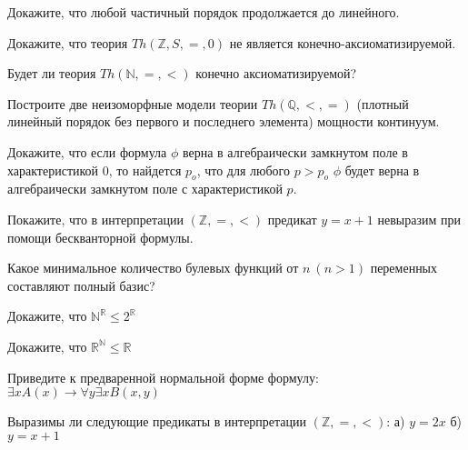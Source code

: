 \begin{task}
    Докажите, что любой частичный порядок продолжается до линейного.
\end{task}

\begin{task}
    Докажите, что теория $Th(\mathbb{Z}, S, =, 0)$ не является
    конечно-аксиоматизируемой.
\end{task}

\begin{task}
    Будет ли теория $Th(\mathbb{N}, =, <)$ конечно аксиоматизируемой?
\end{task}

\begin{task}
    Построите две неизоморфные модели теории $Th(\mathbb{Q}, <, =)$
    (плотный линейный порядок без первого и последнего элемента)
    мощности континуум.
\end{task}

\begin{task}
    Докажите, что если формула $\phi$ верна в алгебраически замкнутом
    поле в характеристикой 0, то найдется $p_o$, что для любого $p >
    p_o$ $\phi$ будет верна в алгебраически замкнутом поле с
    характеристикой $p$.
\end{task}

\begin{task}
    Покажите, что в интерпретации $(\mathbb{Z}, =, <)$ предикат $y = x
    + 1$ невыразим при помощи бескванторной формулы.
\end{task}

\begin{task}
    Какое минимальное количество булевых функций от $n~ (n > 1)$
    переменных составляют полный базис?
\end{task}

\begin{task}
    Докажите, что $\mathbb{N}^{\mathbb{R}} \le 2^{\mathbb{R}}$
\end{task}

\begin{task}
    Докажите, что $\mathbb{R}^{\mathbb{N}} \le \mathbb{R}$
\end{task}

\begin{task}
    Приведите к предваренной нормальной форме формулу:
    $\exists x A(x) \rightarrow  \forall y \exists x B(x, y)$
\end{task}

\begin{task}
    Выразимы ли следующие предикаты в интерпретации
    $(\mathbb{Z}, =, <)$:
    а) $y = 2x$
    б) $y = x + 1$
\end{task}
